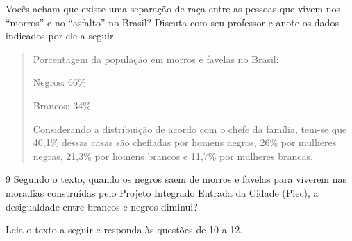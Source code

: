 
\noindent{}Vocês acham que existe uma separação de raça entre as pessoas que vivem
nos “morros” e no “asfalto” no Brasil? Discuta com seu professor e anote
os dados indicados por ele a seguir.

\begin{quote}
Porcentagem da população em morros e favelas no Brasil:

Negros: 66\%

Brancos: 34\%

Considerando a distribuição de acordo com o chefe da família, tem-se que
40,1\% dessas casas são chefiadas por homens negros, 26\% por mulheres
negras, 21,3\% por homens brancos e 11,7\% por mulheres brancas.
\end{quote}

\num{9} Segundo o texto, quando os negros saem de morros e favelas para viverem nas
moradias construídas pelo Projeto Integrado Entrada da Cidade (Piec), a
desigualdade entre brancos e negros diminui?


\pagebreak
Leia o texto a seguir e responda às questões de 10 a 12.


